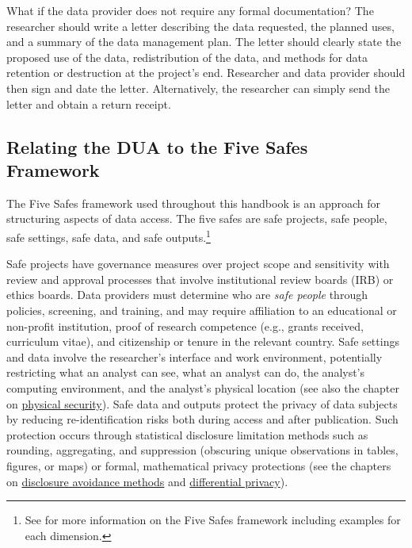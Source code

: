 \documentclass[
]{book}
\begin{document}
\begin{bbox}

What if the data provider does not require any formal documentation? The researcher should write a letter describing the data requested, the planned uses, and a summary of the data management plan. The letter should clearly state the proposed use of the data, redistribution of the data, and methods for data retention or destruction at the project's end. Researcher and data provider should then sign and date the letter. Alternatively, the researcher can simply send the letter and obtain a return receipt.

\end{bbox}

\hypertarget{relating-the-dua-to-the-five-safes-framework}{%
\subsection{Relating the DUA to the Five Safes Framework}\label{relating-the-dua-to-the-five-safes-framework}}

The Five Safes framework used throughout this handbook is an approach for structuring aspects of data access. The five safes are safe projects, safe people, safe settings, safe data, and safe outputs.\footnote{See \citet{desai2016} for more information on the Five Safes framework including examples for each dimension.}

Safe projects have governance measures over project scope and sensitivity with review and approval processes that involve institutional review boards (IRB) or ethics boards. Data providers must determine who are \emph{safe people} through policies, screening, and training, and may require affiliation to an educational or non-profit institution, proof of research competence (e.g., grants received, curriculum vitae), and citizenship or tenure in the relevant country. Safe settings and data involve the researcher's interface and work environment, potentially restricting what an analyst can see, what an analyst can do, the analyst's computing environment, and the analyst's physical location (see also the chapter on \protect\hyperlink{security}{physical security}). Safe data and outputs protect the privacy of data subjects by reducing re-identification risks both during access and after publication. Such protection occurs through statistical disclosure limitation methods such as rounding, aggregating, and suppression (obscuring unique observations in tables, figures, or maps) or formal, mathematical privacy protections (see the chapters on \protect\hyperlink{discavoid}{disclosure avoidance methods} and \protect\hyperlink{diffpriv}{differential privacy}).
\end{document}

